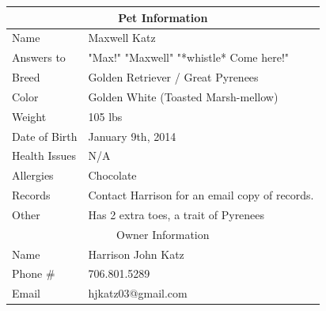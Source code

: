 \documentclass[pdftex,12pt]{article}
\begin{document}
\begin{table}[H]
    \begin{longtable}{@{}ll@{}}
        \toprule
        \multicolumn{2}{c}{Pet Information}                                                                                    \\ \midrule
        Name          & Maxwell Katz                                                                                           \\
        Answers to    & "Max!" "Maxwell" "*whistle* Come here!"                                                                \\
        Breed         & Golden Retriever / Great Pyrenees                                                                      \\
        Color         & Golden White (Toasted Marsh-mellow)                                                                    \\
        Weight        & 105 lbs                                                                                                \\
        Date of Birth & January 9th, 2014                                                                                      \\
        Health Issues & N/A                                                                                                    \\
        Allergies     & Chocolate                                                                                              \\
        Records       & Contact Harrison for an email copy of records.                                                         \\
        Other         & Has 2 extra toes, a trait of Pyrenees                                                                  \\ \midrule
        \multicolumn{2}{c}{Owner Information}                                                                                  \\ \midrule
        Name          & Harrison John Katz                                                                                     \\
        Phone \#      & 706.801.5289                                                                                           \\
        Email         & hjkatz03@gmail.com                                                                                     \\ \midrule

\end{longtable}
\end{table}
\end{document}
